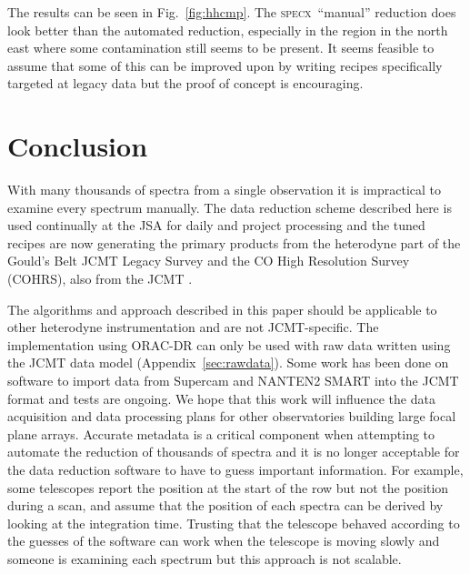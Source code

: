 \documentclass[a4paper,fleqn,usenatbib]{mnras}
\newcommand{\specx}{\textsc{specx}}
\begin{document}
The results can be seen in Fig.\ \ref{fig:hhcmp}. The \specx\ ``manual''
reduction does look better than the automated reduction, especially in
the region in the north east where some contamination still seems to
be present. It seems feasible to assume that some of this can be
improved upon by writing recipes specifically targeted at legacy data
but the proof of concept is encouraging.

\section{Conclusion}

With many thousands of spectra from a single observation it is
impractical to examine every spectrum manually. The data reduction
scheme described here is used continually at the JSA
\citep{2011ASPC..442..203E,2014SPIE9152-93} for daily and project processing and the
tuned recipes are now generating the primary products from the
heterodyne part of the Gould's Belt JCMT Legacy Survey
\citep{2007PASP..119..855W} and the CO High Resolution Survey
(COHRS), also from the JCMT \citep{2013ApJS..209....8D}.

The algorithms and approach described in this paper should be
applicable to other heterodyne instrumentation and are not
JCMT-specific. The implementation using ORAC-DR can only be used with
raw data written using the JCMT data model
(Appendix~\ref{sec:rawdata}). Some work has been done on software to
import data from Supercam \citep{2012SPIE.8452E..04K} and NANTEN2
SMART \citep{2008stt..conf..488G} into the JCMT format and tests are
ongoing. We hope that this work will influence the data acquisition
and data processing plans for other observatories building large focal
plane arrays. Accurate metadata is a critical component when
attempting to automate the reduction of thousands of spectra and it is
no longer acceptable for the data reduction software to have to guess
important information. For example, some telescopes report the
position at the start of the row but not the position during a scan,
and assume that the position of each spectra can be derived by looking
at the integration time. Trusting that the telescope behaved according
to the guesses of the software can work when the telescope is moving
slowly and someone is examining each spectrum but this approach is not
scalable.
\end{document}
